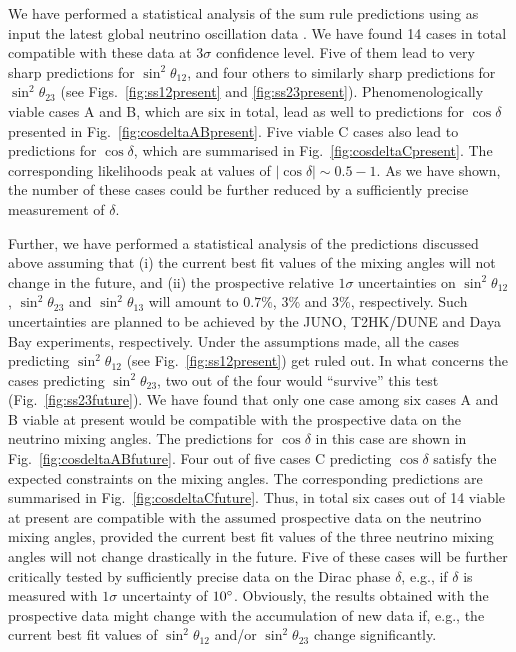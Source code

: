 \documentclass[11pt,a4paper]{article}
\def\th{\theta}
\numberwithin{equation}{section}
\begin{document}
 We have performed a statistical analysis of the sum rule predictions 
using as input the latest global neutrino oscillation 
data \cite{NuFITv32Jan2018}.
We have found 14 cases in total compatible with these data at 
$3\sigma$ confidence level.
Five of them lead to very sharp predictions for $\sin^2\th_{12}$, 
and four others to similarly sharp 
predictions for $\sin^2\th_{23}$ 
(see Figs.~\ref{fig:ss12present} and \ref{fig:ss23present}). 
Phenomenologically viable
cases A and B, which are six in total, 
lead as well to predictions for $\cos\delta$ 
presented in Fig.~\ref{fig:cosdeltaABpresent}.
Five viable C cases also lead to predictions 
for $\cos\delta$, which are summarised  
in Fig.~\ref{fig:cosdeltaCpresent}.
The corresponding likelihoods 
peak at values of $|\cos\delta| \sim 0.5-1$. 
As we have shown, the number of these cases could be further 
reduced by a sufficiently precise measurement of $\delta$.

 Further, we have performed a statistical analysis of 
the predictions discussed above assuming that 
(i) the current best fit values of the mixing angles 
will not change in the future, 
and (ii) the prospective relative $1\sigma$ uncertainties on 
$\sin^2\th_{12}$, $\sin^2\th_{23}$ and $\sin^2\th_{13}$ 
will amount to $0.7\%$, $3\%$ and $3\%$, respectively.
Such uncertainties are planned to be achieved by 
the JUNO, T2HK/DUNE and Daya Bay experiments, respectively.
Under the assumptions made, all the cases predicting $\sin^2\th_{12}$ 
(see Fig.~\ref{fig:ss12present}) get ruled out. 
In what concerns the cases predicting $\sin^2\th_{23}$, two out of
the four would ``survive'' this test  
(Fig.~\ref{fig:ss23future}). 
We have found that only one case among six cases A and B  
viable at present 
would be compatible with the prospective data on the neutrino mixing angles. 
The predictions for $\cos\delta$ in this case are shown in Fig.~\ref{fig:cosdeltaABfuture}.
Four out of five cases C predicting $\cos\delta$ 
satisfy the expected constraints on the mixing angles. 
The corresponding predictions are summarised in Fig.~\ref{fig:cosdeltaCfuture}. 
Thus, in total six cases out of 14 viable at present are compatible 
with the assumed prospective data on the neutrino mixing angles,
provided the current best fit values of the three neutrino 
mixing angles will not change drastically in the future. 
Five of these cases will be further 
critically tested by sufficiently precise data on 
the Dirac phase $\delta$, e.g., if $\delta$ is measured with 
$1\sigma$ uncertainty of $10\degree$.
Obviously, the results obtained with the prospective data 
might change with the accumulation of new data 
if, e.g., the current best fit values of $\sin^2\th_{12}$ and/or $\sin^2\th_{23}$ 
change significantly.
\end{document}
